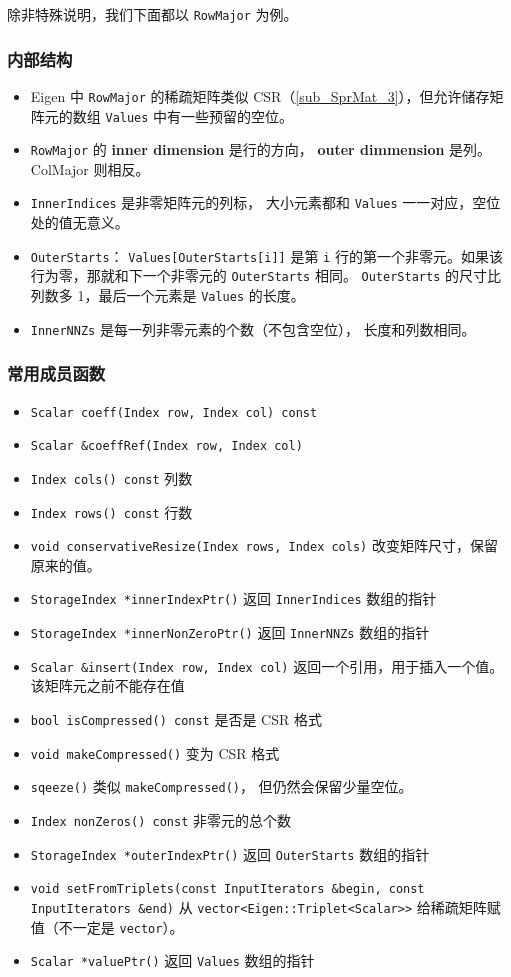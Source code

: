除非特殊说明，我们下面都以 \verb|RowMajor| 为例。

\subsubsection{内部结构}
\begin{itemize}
\item Eigen 中 \verb|RowMajor| 的稀疏矩阵类似 CSR（\autoref{sub_SprMat_3}），但允许储存矩阵元的数组 \verb|Values| 中有一些预留的空位。
\item \verb|RowMajor| 的 \textbf{inner dimension} 是行的方向， \textbf{outer dimmension} 是列。 ColMajor 则相反。
\item \verb|InnerIndices| 是非零矩阵元的列标， 大小元素都和 \verb|Values| 一一对应，空位处的值无意义。
\item \verb|OuterStarts|： \verb|Values[OuterStarts[i]]| 是第 \verb|i| 行的第一个非零元。如果该行为零，那就和下一个非零元的 \verb|OuterStarts| 相同。 \verb|OuterStarts| 的尺寸比列数多 1，最后一个元素是 \verb|Values| 的长度。
\item \verb|InnerNNZs| 是每一列非零元素的个数（不包含空位）， 长度和列数相同。
\end{itemize}

\subsubsection{常用成员函数}
\begin{itemize}
\item \verb|Scalar coeff(Index row, Index col) const|
\item \verb|Scalar &coeffRef(Index row, Index col)|
\item \verb|Index cols() const| 列数
\item \verb|Index rows() const| 行数
\item \verb|void conservativeResize(Index rows, Index cols)| 改变矩阵尺寸，保留原来的值。
\item \verb|StorageIndex *innerIndexPtr()| 返回 \verb|InnerIndices| 数组的指针
\item \verb|StorageIndex *innerNonZeroPtr()| 返回 \verb|InnerNNZs| 数组的指针
\item \verb|Scalar &insert(Index row, Index col)| 返回一个引用，用于插入一个值。该矩阵元之前不能存在值
\item \verb|bool isCompressed() const| 是否是 CSR 格式
\item \verb|void makeCompressed()| 变为 CSR 格式
\item \verb|sqeeze()| 类似 \verb|makeCompressed()|， 但仍然会保留少量空位。
\item \verb|Index nonZeros() const| 非零元的总个数
\item \verb|StorageIndex *outerIndexPtr()| 返回 \verb|OuterStarts| 数组的指针

\item \verb|void setFromTriplets(const InputIterators &begin, const InputIterators &end)| 从 \verb|vector<Eigen::Triplet<Scalar>>| 给稀疏矩阵赋值（不一定是 \verb|vector|）。
\item \verb|Scalar *valuePtr()| 返回 \verb|Values| 数组的指针
\end{itemize}

